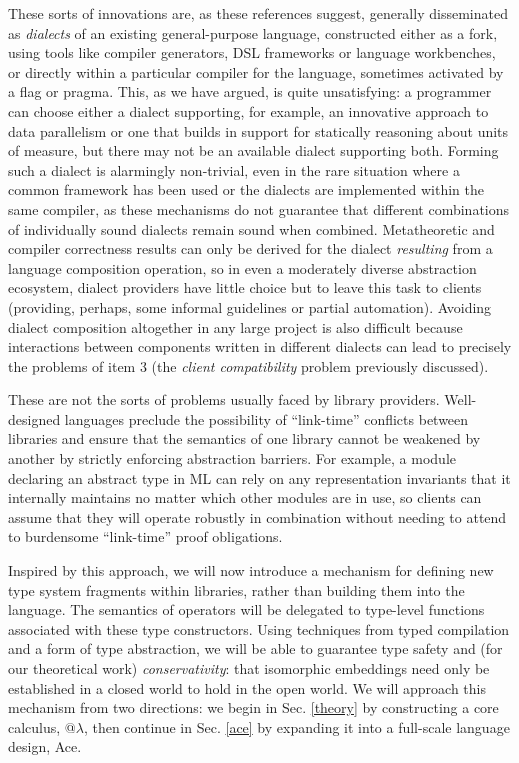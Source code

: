 These sorts of innovations are, as these references suggest, generally disseminated as \emph{dialects} of an existing general-purpose language, constructed either as a fork, using tools like compiler generators, DSL frame\-works or  language workbenches, or directly within a particular compiler for the language, sometimes activated by a flag or pragma. This, as we have argued, is quite unsatisfying: a programmer can choose either a dialect supporting, for example, an innovative approach to data parallelism or one that builds in support for statically reasoning about units of measure, but there may not be an available dialect supporting both. Forming such a dialect is alarmingly non-trivial, even in the rare situation where a common framework has been used or the dialects are implemented within the same compiler, as these mechanisms do not guarantee that different combinations of individually sound dialects remain sound when combined. Metatheoretic and compiler correctness results can only be derived for the dialect \emph{resulting} from a language   composition operation, so in even a moderately diverse abstraction ecosystem, dialect providers have little choice but to leave this task to clients (providing, perhaps, some informal guidelines or partial automation). Avoiding dialect composition altogether in any large project is also difficult because interactions between components written in different dialects can lead to precisely the problems of item 3 (the \emph{client compatibility} problem previously discussed).%

These are not the sorts of problems usually faced by library providers. Well-designed languages preclude the  possibility of ``link-time'' conflicts between libraries and ensure that the semantics of one library  cannot be weakened by another by strictly enforcing abstraction barriers. For example, a module declaring an abstract type in ML can rely on any representation invariants that it internally maintains no matter which other modules are in use, so clients can assume that they will operate robustly in combination without needing to attend to burdensome ``link-time'' proof obligations. 

Inspired by this approach, we will now introduce a mechanism for defining new type system fragments within libraries, rather than building them into the language. The semantics of operators will be delegated to type-level functions associated with these type constructors. Using techniques from typed compilation and a form of type abstraction, we will be able to guarantee type safety and  (for our theoretical work) \emph{conservativity}: that isomorphic embeddings need only be established in a closed world to hold in the open world. We will approach this mechanism from two directions: we begin in Sec. \ref{theory} by constructing a core calculus, @$\lambda$, then continue in Sec. \ref{ace} by expanding it into a full-scale language design, Ace.


